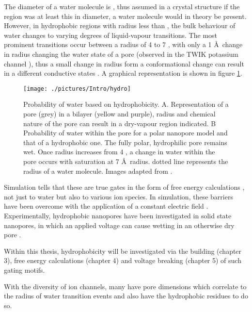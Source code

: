The diameter of a water molecule is  \angstrom, thus assumed in a crystal structure if the region was at least this in diameter, a water molecule would in theory be present. However, in hydrophobic regions with radius less than  \angstrom, the bulk behaviour of water changes to varying degrees of liquid-vapour transitions. The most prominent transitions occur between a radius of 4 to 7 \angstrom, with only a 1 \AA\ change in radius changing the water state of a pore (observed in the TWIK potassium channel \cite{Aryal2014g}), thus a small change in radius form a conformational change can result in a different conductive states \cite{Beckstein2003}. A graphical representation is shown in figure \ref{fig:hydro}. 

\begin{figure}[H]
\begin{center}
\texttt{[image: ./pictures/Intro/hydro]}
\caption[Probability of water based on hydrophobicity] {Probability of water based on hydrophobicity. A. Representation of a pore (grey) in a bilayer (yellow and purple), radius and chemical nature of the pore can result in a dry-vapour region indicated. B Probability of water within the pore for a polar nanopore model and that of a hydrophobic one. The fully polar, hydrophilic pore remains wet. Once radius increases from 4 \angstrom, a change in water within the pore occurs with saturation at 7 \AA\ radius. dotted line represents the radius of a water molecule. Images adapted from \cite{Aryal2014i,Beckstein2004c}.}
\label{fig:hydro}
\end{center}
\end{figure}

Simulation tells that these are true gates in the form of free energy calculations \cite{Beckstein2004a}, not just to water but also to various ion species. In simulation, these barriers have been overcome with the application of a constant electric field \cite{Dzubiella2004d}. Experimentally, hydrophobic nanopores have been investigated in solid state nanopores, in which an applied voltage can cause wetting in an otherwise dry pore \cite{Powell2011}. 

Within this thesis, hydrophobicity will be investigated via the building (chapter 3), free energy calculations (chapter 4) and voltage breaking (chapter 5) of such gating motifs.

With the diversity of ion channels, many have pore dimensions which correlate to the radius of water transition events and also have the hydrophobic residues to do so. 

